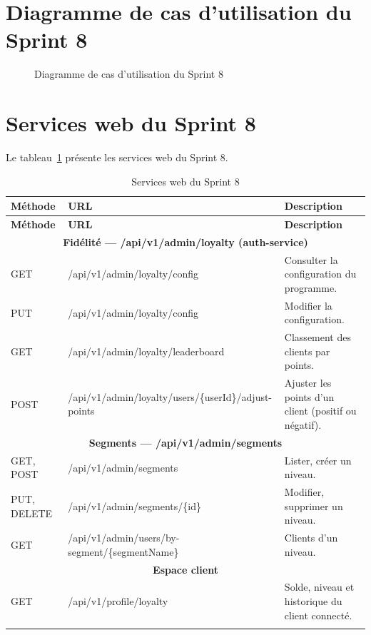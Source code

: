\section{Diagramme de cas d'utilisation du Sprint 8}
\begin{figure}[H]
    \centering
    \caption{Diagramme de cas d'utilisation du Sprint 8}
    \label{fig:cu-sprint8}
\end{figure}

\section{Services web du Sprint 8}
Le tableau~\ref{tab:ws-sprint8} présente les services web du Sprint 8.
\renewcommand{\arraystretch}{1.15}
\setlength{\tabcolsep}{4pt}
\begin{longtable}{|p{1.5cm}|p{6.8cm}|p{6.2cm}|}
\hline
\textbf{Méthode} & \textbf{URL} & \textbf{Description} \\
\hline
\endfirsthead
\hline
\textbf{Méthode} & \textbf{URL} & \textbf{Description} \\
\hline
\endhead
\multicolumn{3}{|c|}{\textbf{Fidélité --- /api/v1/admin/loyalty (auth-service)}} \\
\hline
GET & /api/v1/admin/loyalty/config & Consulter la configuration du programme. \\
\hline
PUT & /api/v1/admin/loyalty/config & Modifier la configuration. \\
\hline
GET & /api/v1/admin/loyalty/leaderboard & Classement des clients par points. \\
\hline
POST & /api/v1/admin/loyalty/users/\{userId\}/adjust-points & Ajuster les points d'un client (positif ou négatif). \\
\hline
\multicolumn{3}{|c|}{\textbf{Segments --- /api/v1/admin/segments}} \\
\hline
GET, POST & /api/v1/admin/segments & Lister, créer un niveau. \\
\hline
PUT, DELETE & /api/v1/admin/segments/\{id\} & Modifier, supprimer un niveau. \\
\hline
GET & /api/v1/admin/users/by-segment/\{segmentName\} & Clients d'un niveau. \\
\hline
\multicolumn{3}{|c|}{\textbf{Espace client}} \\
\hline
GET & /api/v1/profile/loyalty & Solde, niveau et historique du client connecté. \\
\hline
\caption{Services web du Sprint 8}
\label{tab:ws-sprint8}
\end{longtable}

